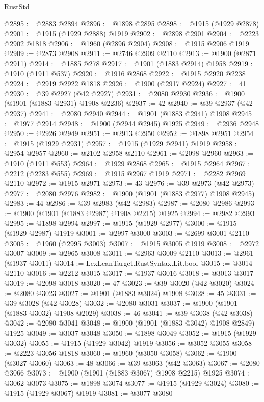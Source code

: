 \begin{lexlean}{RustStd}
\begin{coremodule}
@2895 := @2883 @2894
@2896 := @1898 @2895
@2898 := @1915 (@1929 @2878)
@2901 := @1915 (@1929 @2888) @1919
@2902 := @2898 @2901
@2904 := @2223 @2902 @1818
@2906 := @1960 (@2896 @2904)
@2908 := @1915 @2906 @1919
@2909 := @2873 @2908
@2911 := @2746 @2909 @2110
@2913 := @1900 (@2871 @2911)
@2914 := @1885 @278
@2917 := @1901 (@1883 @2914) @1958
@2919 := @1910 (@1911 @537)
@2920 := @1916 @2868
@2922 := @1915 @2920 @2238
@2924 := @2919 @2922 @1818
@2926 := @1900 (@2917 @2924)
@2927 := 41
@2930 := @39 @2927 (@42 @2927)
@2931 := @2080 @2930
@2936 := @1900 (@1901 (@1883 @2931) @1908 @2236)
@2937 := 42
@2940 := @39 @2937 (@42 @2937)
@2941 := @2080 @2940
@2944 := @1901 (@1883 @2941) @1908
@2945 := @1977 @2914
@2948 := @1900 (@2944 @2945) @1925
@2949 := @2936 @2948
@2950 := @2926 @2949
@2951 := @2913 @2950
@2952 := @1898 @2951
@2954 := @1915 (@1929 @2931)
@2957 := @1915 (@1929 @2941) @1919
@2958 := @2954 @2957
@2960 := @2102 @2958 @2110
@2961 := @2098 @2960
@2963 := @1910 (@1911 @553)
@2964 := @1929 @2868
@2965 := @1915 @2964
@2967 := @2212 (@2283 @555)
@2969 := @1915 @2967 @1919
@2971 := @2282 @2969 @2110
@2972 := @1915 @2971
@2973 := 43
@2976 := @39 @2973 (@42 @2973)
@2977 := @2080 @2976
@2982 := @1900 (@1901 (@1883 @2977) @1908 @2945)
@2983 := 44
@2986 := @39 @2983 (@42 @2983)
@2987 := @2080 @2986
@2993 := @1900 (@1901 (@1883 @2987) @1908 @2215) @1925
@2994 := @2982 @2993
@2995 := @1898 @2994
@2997 := @1915 (@1929 @2977)
@3000 := @1915 (@1929 @2987) @1919
@3001 := @2997 @3000
@3003 := @2699 @3001 @2110
@3005 := @1960 (@2995 @3003)
@3007 := @1915 @3005 @1919
@3008 := @2972 @3007
@3009 := @2965 @3008
@3011 := @2963 @3009 @2110
@3013 := @2961 (@1937 @3011)
@3014 := LexLeanTarget.RustSyntax.Lit.bool
@3015 := @3014 @2110
@3016 := @2212 @3015
@3017 := @1937 @3016
@3018 := @3013 @3017
@3019 := @2098 @3018
@3020 := 47
@3023 := @39 @3020 (@42 @3020)
@3024 := @2080 @3023
@3027 := @1901 (@1883 @3024) @1908
@3028 := 45
@3031 := @39 @3028 (@42 @3028)
@3032 := @2080 @3031
@3037 := @1900 (@1901 (@1883 @3032) @1908 @2029)
@3038 := 46
@3041 := @39 @3038 (@42 @3038)
@3042 := @2080 @3041
@3048 := @1900 (@1901 (@1883 @3042) @1908 @2849) @1925
@3049 := @3037 @3048
@3050 := @1898 @3049
@3052 := @1915 (@1929 @3032)
@3055 := @1915 (@1929 @3042) @1919
@3056 := @3052 @3055
@3058 := @2223 @3056 @1818
@3060 := @1960 (@3050 @3058)
@3062 := @1900 (@3027 @3060)
@3063 := 48
@3066 := @39 @3063 (@42 @3063)
@3067 := @2080 @3066
@3073 := @1900 (@1901 (@1883 @3067) @1908 @2215) @1925
@3074 := @3062 @3073
@3075 := @1898 @3074
@3077 := @1915 (@1929 @3024)
@3080 := @1915 (@1929 @3067) @1919
@3081 := @3077 @3080

\end{coremodule}
\end{lexlean}
